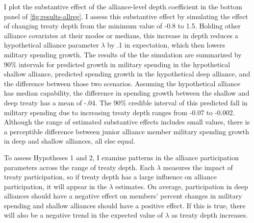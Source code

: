 \documentclass[12pt]{article}
\begin{document}
I plot the substantive effect of the alliance-level depth coefficient in the bottom panel of \autoref{fig:results-allreg}. 
I assess this substantive effect by simulating the effect of changing treaty depth from the minimum value of -0.8 to 1.5. 
Holding other alliance covariates at their modes or medians, this increase in depth reduces a hypothetical alliance parameter $\lambda$ by .1 in expectation, which then lowers military spending growth.
The results of the the simulation are summarized by 90\% intervals for predicted growth in military spending in the hypothetical shallow alliance, predicted spending growth in the hypothetical deep alliance, and the difference between those two scenarios.
Assuming the hypothetical alliance has median capability, the difference in spending growth between the shallow and deep treaty has a mean of -.04.
The 90\% credible interval of this predicted fall in military spending due to increasing treaty depth ranges from -0.07 to -0.002.
Although the range of estimated substantive effects includes small values, there is a perceptible difference between junior alliance member military spending growth in deep and shallow alliances, all else equal.  


To assess Hypotheses 1 and 2, I examine patterns in the alliance participation parameters across the range of treaty depth.
Each $\lambda$ measures the impact of treaty participation, so if treaty depth has a large influence on alliance participation, it will appear in the $\lambda$ estimates. 
On average, participation in deep alliances should have a negative effect on members' percent changes in military spending and shallow alliances should have a positive effect.
If this is true, there will also be a negative trend in the expected value of $\lambda$ as treaty depth increases.
\end{document}
